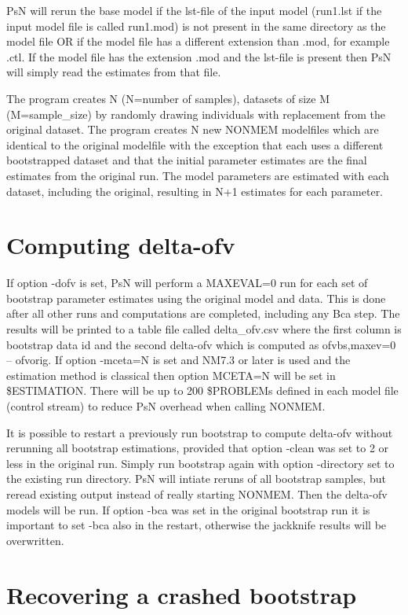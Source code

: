 \documentclass[a4paper,12pt]{article}
\begin{document}
PsN will rerun the base model if the lst-file of the input model (run1.lst if the input model file is called run1.mod) is not present in the same directory as the model file OR if the model file has a different extension than .mod, for example .ctl. If the model file has the extension .mod and the lst-file is present then PsN will simply read the estimates from that file.

The program creates N (N=number of samples), datasets of size M (M=sample\_size) by randomly drawing individuals with replacement from the original dataset. The program creates N new NONMEM modelfiles which are identical to the original modelfile with the exception that each uses a different  bootstrapped dataset and that the initial parameter estimates are the final estimates from the original run. The model parameters are estimated with each dataset, including the original, resulting in N+1 estimates for each parameter.

\section{Computing delta-ofv}

If option -dofv is set, PsN will perform a MAXEVAL=0 run for each set of bootstrap parameter estimates using the original model and data. This is done after all other runs and computations are completed, including any Bca step. The results will be printed to a table file called delta\_ofv.csv where the first column is bootstrap data id and the second delta-ofv which is computed as ofvbs,maxev=0 – ofvorig. If option -mceta=N is set and NM7.3 or later is used and the estimation method is classical then option MCETA=N will be set in \$ESTIMATION. There will be up to 200 \$PROBLEMs defined in each model file (control stream) to reduce PsN overhead when calling NONMEM.

It is possible to restart a previously run bootstrap to compute delta-ofv without rerunning all bootstrap estimations, provided that option -clean was set to 2 or less in the original run. Simply run bootstrap again with option -directory set to the existing run directory. PsN will intiate reruns of all bootstrap samples, but reread existing output instead of really starting NONMEM. Then the delta-ofv models will be run. If option -bca was set in the original bootstrap run it is important to set -bca also in the restart, otherwise the jackknife results will be overwritten. 

\section{Recovering a crashed bootstrap}
\end{document}
